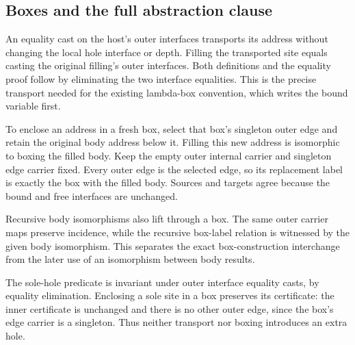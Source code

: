 





\subsection{Boxes and the full abstraction clause}


An equality cast on the host's outer interfaces transports its address
without changing the local hole interface or depth. Filling the transported
site equals casting the original filling's outer interfaces. Both definitions
and the equality proof follow by eliminating the two interface equalities.
This is the precise transport needed for the existing lambda-box convention,
which writes the bound variable first.





To enclose an address in a fresh box, select that box's singleton outer edge
and retain the original body address below it. Filling this new address is
isomorphic to boxing the filled body. Keep the empty outer internal carrier
and singleton edge carrier fixed. Every outer edge is the selected edge, so
its replacement label is exactly the box with the filled body. Sources and
targets agree because the bound and free interfaces are unchanged.

Recursive body isomorphisms also lift through a box. The same outer carrier
maps preserve incidence, while the recursive box-label relation is witnessed
by the given body isomorphism. This separates the exact box-construction
interchange from the later use of an isomorphism between body results.







The sole-hole predicate is invariant under outer interface equality casts,
by equality elimination. Enclosing a sole site in a box preserves its
certificate: the inner certificate is unchanged and there is no other outer
edge, since the box's edge carrier is a singleton. Thus neither transport
nor boxing introduces an extra hole.

